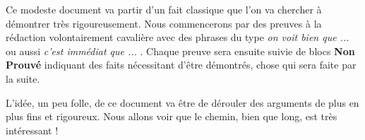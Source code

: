 Ce modeste document va partir d'un fait classique que l'on va chercher à démontrer très rigoureusement.
Nous commencerons par des preuves à la rédaction volontairement cavalière avec des phrases du type \emph{\og on voit bien que ... \fg} ou aussi \emph{\og c'est immédiat que ... \fg}.
Chaque preuve sera ensuite suivie de blocs \textbf{Non Prouvé} indiquant des faits nécessitant d'être démontrés, chose qui sera faite par la suite.


\medskip


L'idée, un peu folle, de ce document va être de dérouler des arguments de plus en plus fins et rigoureux. Nous allons voir que le chemin, bien que long, est très intéressant !


